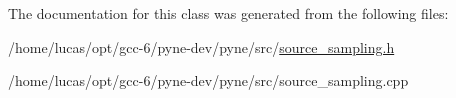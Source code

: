 The documentation for this class was generated from the following files\+:\begin{DoxyCompactItemize}
\item 
/home/lucas/opt/gcc-\/6/pyne-\/dev/pyne/src/\hyperlink{source__sampling_8h}{source\+\_\+sampling.\+h}\item 
/home/lucas/opt/gcc-\/6/pyne-\/dev/pyne/src/source\+\_\+sampling.\+cpp\end{DoxyCompactItemize}
